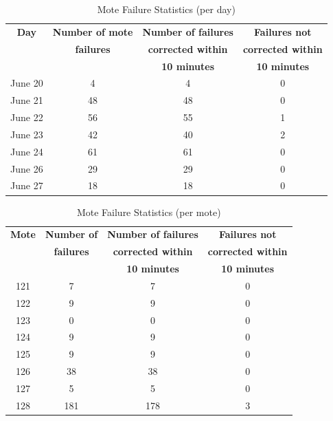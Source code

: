 \begin{table}[htbp]
\begin{center}
\begin{tabular}{|c|c|c|c|}
\hline 
\textbf{Day} & \textbf{Number of mote} & \textbf{Number of failures} & \textbf{Failures not} \\ 
 & \textbf{failures} & \textbf{corrected within} & \textbf{corrected within} \\ 
 &   & \textbf{10 minutes}  & \textbf{10 minutes} \\
\hline 
\hline 
June 20 & 4 & 4 & 0 \\ 
\hline 
June 21 & 48 & 48 & 0 \\ 
\hline 
June 22 & 56 & 55 & 1 \\ 
\hline 
June 23 & 42 & 40 & 2 \\ 
\hline 
June 24 & 61 & 61 & 0 \\ 
\hline 
June 26 & 29 & 29 & 0 \\ 
\hline 
June 27 & 18 & 18 & 0 \\ 
\hline 
\end{tabular}
\end{center} 
\caption{Mote Failure Statistics (per day)}
\label{table_selfHealingSystem}
\end{table}


\begin{table}[htbp]
\begin{center}
\begin{tabular}{|c|c|c|c|}
\hline 
\textbf{Mote} & \textbf{Number of} & \textbf{Number of failures} & \textbf{Failures not} \\ 
 & \textbf{failures} & \textbf{corrected within} & \textbf{corrected within} \\ 
 &   & \textbf{10 minutes}  & \textbf{10 minutes} \\
\hline 
\hline 
121 & 7 & 7 & 0 \\ 
\hline 
122 & 9 & 9 & 0 \\ 
\hline 
123 & 0 & 0 & 0 \\ 
\hline 
124 & 9 & 9 & 0 \\ 
\hline 
125 & 9 & 9 & 0 \\ 
\hline 
126 & 38 & 38 & 0 \\ 
\hline 
127 & 5 & 5 & 0 \\ 
\hline 
128 & 181 & 178 & 3 \\ 
\hline 
\end{tabular}
\end{center} 
\caption{Mote Failure Statistics (per mote)}
\label{table_selfHealingMote}
\end{table}

